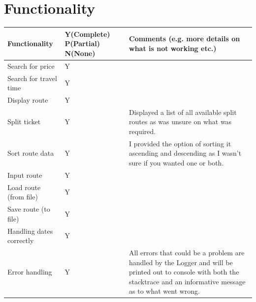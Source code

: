 \documentclass[10pt, a4paper]{article}
\begin{document}
\section{Functionality}
\begin{table}[h]
\begin{tabular}{|p{125pt} | p{60pt} | p{300pt}|}
\hline
\textbf{Functionality} & \textbf{Y(Complete) P(Partial) N(None)} & \textbf{Comments (e.g. more details on what is not working etc.)} \\ \hline
Search for price & Y & \\ \hline
Search for travel time & Y & \\ \hline
Display route & Y & \\ \hline
Split ticket & Y & Displayed a list of all available split routes as was unsure on what was required. \\ \hline
Sort route data & Y & I provided the option of sorting it ascending and descending as I wasn't sure if you wanted one or both. \\ \hline
Input route & Y & \\ \hline
Load route (from file) & Y & \\ \hline
Save route (to file) & Y & \\ \hline
Handling dates correctly & Y & \\ \hline
Error handling & Y & All errors that could be a problem are handled by the Logger and will be printed out to console with both the stacktrace and an informative message as to what went wrong.\\ \hline
\end{tabular}
\end{table}
\end{document}
